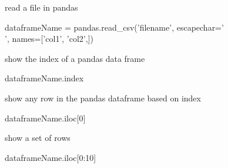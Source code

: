 

read a file in pandas

dataframeName = pandas.read_csv('filename', escapechar='\\', names=['col1', 'col2',])

show the index of a pandas data frame

dataframeName.index

show any row in the pandas dataframe based on index

dataframeName.iloc[0]

show a set of rows

dataframeName.iloc[0:10]



